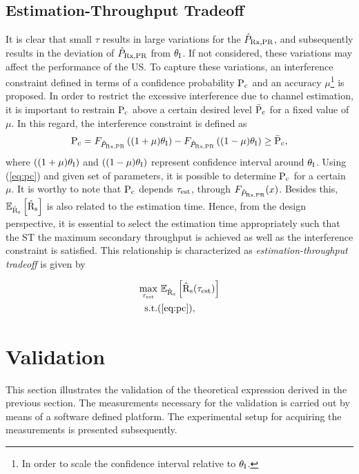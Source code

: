\subsection{Estimation-Throughput Tradeoff}
It is clear that small $\tau$ results in large variations for the $\hat{P}_{\text{Rx,PR}}$, and subsequently results in the deviation of $\hat{P}_{\text{Rx,PR}}$ from $\theta_{\text{I}}$. If not considered, these variations may affect the performance of the US. To capture these variations, an interference constraint defined in terms of a confidence probability $\text{P}_{\text{c}}$ and an accuracy $\mu$\footnote{In order to scale the confidence interval relative to $\theta_{\text{I}}$.} is proposed. In order to restrict the excessive interference due to channel estimation, it is important to restrain $\text{P}_{\text{c}}$ above a certain desired level $\bar{\text{P}}_{\text{c}}$ for a fixed value of $\mu$. In this regard, the interference constraint is defined as
\begin{align}
\text{P}_{\text{c}} = F_{\hat{P}_{\text{Rx,PR}}} \left( {(1 + \mu) \theta_{\text{I}}}\right)  - F_{\hat{P}_{\text{Rx,PR}}} \left({(1 - \mu) \theta_{\text{I}}} \right) \ge \bar{\text{P}}_{\text{c}}, \label{eq:pc} 
\end{align}
where $\left( {(1 + \mu) \theta_{\text{I}}}\right)$ and $\left({(1 - \mu) \theta_{\text{I}}} \right)$ represent confidence interval around $\theta_{\text{I}}$. Using (\ref{eq:pc}) and given set of parameters, it is possible to determine $\text{P}_{\text{c}}$ for a certain $\mu$. It is worthy to note that $\text{P}_{\text{c}}$ depends $\tau_{\text{est}}$, through $F_{\hat{P}_{\text{Rx,PR}}}(x)$. Besides this, ${\mathbb E}_{\hat{\text{{R}}}_{\text{s}}}\left[ \hat{\text{{R}}}_{\text{s}} \right]$ is also related to the estimation time. Hence, from the design perspective, it is essential to select the estimation time appropriately such that the ST the maximum secondary throughput is achieved as well as the interference constraint is satisfied. This relationship is characterized as \textit{estimation-throughput tradeoff} is given by 

\begin{align}
\operatorname*{max}_{\tau_{\text{est}}}  & \text{      } {\mathbb E}_{\hat{\text{{R}}}_{\text{s}}}\left[ \hat{\text{{R}}}_{\text{s}}(\tau_{\text{est}}) \right] 
 \label{eq:sys} \\
\text{s.t.} & (\ref{eq:pc}), \nonumber  
\end{align}



\section{Validation}
\label{ssec:val}
This section illustrates the validation of the theoretical expression derived in the previous section. The measurements necessary for the validation is carried out by means of a software defined platform. The experimental setup for acquiring the measurements is presented subsequently. 
 

